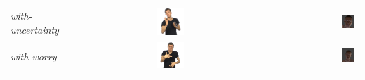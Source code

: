 \documentclass[../main.tex]{subfiles}
\begin{document}
\begin{longtable}{|l|c|r|}
    \emph{with-uncertainty} & \includegraphics[width=0.15\textwidth]{chapters/facial_expressions/images/original_facial_expressions/with_uncertainty.png} & \includegraphics[width=0.15\textwidth]{chapters/facial_expressions/images/flame_facial_exps/with_uncertainity.png} \\
    \emph{with-worry} & \includegraphics[width=0.15\textwidth]{chapters/facial_expressions/images/original_facial_expressions/with_worry.png} & \includegraphics[width=0.15\textwidth]{chapters/facial_expressions/images/flame_facial_exps/with_worry.png} \\
\end{longtable}
\end{document}
